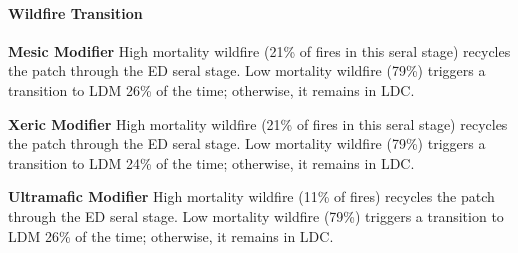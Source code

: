 \paragraph{Wildfire Transition}
\begin{adjustwidth}{2cm}{}
\textbf{Mesic Modifier } High mortality wildfire (21\% of fires in this seral stage) recycles the patch through the ED seral stage. Low mortality wildfire (79\%) triggers a transition to LDM 26\% of the time; otherwise, it remains in LDC.

\medskip
\noindent \textbf{Xeric Modifier} High mortality wildfire (21\% of fires in this seral stage) recycles the patch through the ED seral stage. Low mortality wildfire (79\%) triggers a transition to LDM 24\% of the time; otherwise, it remains in LDC.

\medskip
\noindent \textbf{Ultramafic Modifier} High mortality wildfire (11\% of fires) recycles the patch through the ED seral stage. Low mortality wildfire (79\%) triggers a transition to LDM 26\% of the time; otherwise, it remains in LDC.

\end{adjustwidth}
\noindent\hrulefill



